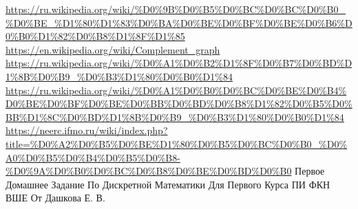 \documentclass{article}
\begin{document}
  \vfill
  \begin{thebibliography}{9}
     \url{https://ru.wikipedia.org/wiki/%D0%9B%D0%B5%D0%BC%D0%BC%D0%B0_%D0%BE_%D1%80%D1%83%D0%BA%D0%BE%D0%BF%D0%BE%D0%B6%D0%B0%D1%82%D0%B8%D1%8F%D1%85}
     \url{https://en.wikipedia.org/wiki/Complement_graph}
     \url{https://ru.wikipedia.org/wiki/%D0%A1%D0%B2%D1%8F%D0%B7%D0%BD%D1%8B%D0%B9_%D0%B3%D1%80%D0%B0%D1%84}
     \url{https://ru.wikipedia.org/wiki/%D0%A1%D0%B0%D0%BC%D0%BE%D0%B4%D0%BE%D0%BF%D0%BE%D0%BB%D0%BD%D0%B8%D1%82%D0%B5%D0%BB%D1%8C%D0%BD%D1%8B%D0%B9_%D0%B3%D1%80%D0%B0%D1%84}
     \url{https://neerc.ifmo.ru/wiki/index.php?title=%D0%A2%D0%B5%D0%BE%D1%80%D0%B5%D0%BC%D0%B0_%D0%A0%D0%B5%D0%B4%D0%B5%D0%B8-%D0%9A%D0%B0%D0%BC%D0%B8%D0%BE%D0%BD%D0%B0}
     Первое Домашнее Задание По Дискретной Математики Для Первого Курса ПИ ФКН ВШЕ От Дашкова Е. В.
  \end{thebibliography}
\end{document}

